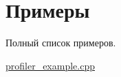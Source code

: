 \section{Примеры}
Полный список примеров.\begin{DoxyCompactItemize}
\item 
\hyperlink{profiler_example_8cpp-example}{profiler\-\_\-example.\-cpp}
\end{DoxyCompactItemize}
